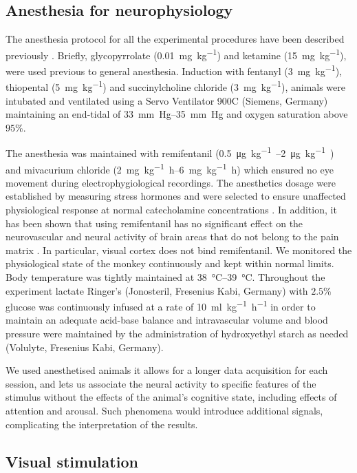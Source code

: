 \subsection{Anesthesia for neurophysiology}

The anesthesia protocol for all the experimental procedures have been described previously \citep{Logothetis1999,Logothetis2001}.
Briefly, glycopyrrolate (\SI{0.01}{mg.{kg}^{-1}}) and ketamine (\SI{15}{mg.{kg}^{-1}}), were used previous to general anesthesia.
Induction with fentanyl (\SI{3}{mg.{kg}^{-1}}), thiopental (\SI{5}{mg.{kg}^{-1}}) and succinylcholine chloride (\SI{3}{mg.{kg}^{-1}}), animals were intubated and ventilated using a Servo Ventilator 900C (Siemens, Germany) maintaining an end-tidal  of \SIrange{33}{35}{mm.Hg} and oxygen saturation above $95\%$.

The anesthesia was maintained with remifentanil (\SIrange{0.5}{2}{\micro\gram.kg^{-1}.\min}) and mivacurium chloride (\SIrange{2}{6}{mg.kg^{-1}.h}) which ensured no eye movement during electrophygiological recordings.
The anesthetics dosage were established by measuring stress hormones and were selected to ensure unaffected physiological response at normal catecholamine concentrations \citep{Logothetis1999}.
In addition, it has been shown that using remifentanil has no significant effect on the neurovascular and neural activity of brain areas that do not belong to the pain matrix \citep{Goense2008,Zappe2008}.
In particular, visual cortex does not bind remifentanil.
We monitored the physiological state of the monkey continuously and kept within normal limits.
Body temperature was tightly maintained at \SIrange{38}{39}{\celsius}.
Throughout the experiment lactate Ringer's (Jonosteril, Fresenius Kabi, Germany) with $2.5\%$ glucose was continuously infused at a rate of \SI{10}{ml.kg^{-1}.h^{-1}} in order to maintain an adequate acid-base balance and intravascular volume and blood pressure were maintained by the administration of hydroxyethyl starch as needed (Volulyte, Fresenius Kabi, Germany).

We used anesthetised animals it allows for a longer data acquisition for each session, and lets us associate the neural activity to specific features of the stimulus without the effects of the animal's cognitive state, including effects of attention and arousal.
Such phenomena would introduce additional signals, complicating the interpretation of the results.


\subsection{Visual stimulation}


